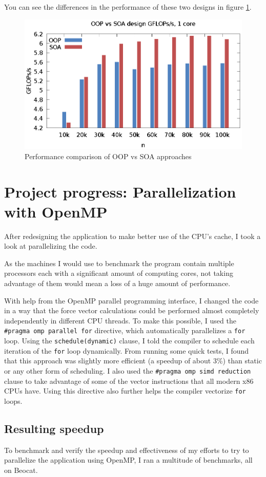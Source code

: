 \documentclass[journal]{IEEEtran}
\begin{document}
			You can see the differences in the performance of these two designs in figure \ref{oopsoa}.		
			
			\begin{figure}[ht]			
				\centering
				\includegraphics[width=.5\textwidth]{gnuplot/oop_vs_arr.eps}
				\caption{\label{oopsoa}Performance comparison of OOP vs SOA approaches}
			\end{figure} 
	
	\section{Project progress: Parallelization with OpenMP}
	
		After redesigning the application to make better use of the CPU's cache, I took a look at parallelizing the code.
		
		As the machines I would use to benchmark the program contain multiple processors each with a significant amount of computing cores, not taking advantage of them would mean a loss of a huge amount of performance.
		
		With help from the OpenMP parallel programming interface, I changed the code in a way that the force vector calculations could be performed almost completely independently in different CPU threads. To make this possible, I used the \texttt{\#pragma omp parallel for} directive, which automatically parallelizes a \texttt{for} loop. Using the \texttt{schedule(dynamic)} clause, I told the compiler to schedule each iteration of the \texttt{for} loop dynamically. From running some quick tests, I found that this approach was slightly more efficient (a speedup of about 3\%) than static or any other form of scheduling. I also used the \texttt{\#pragma omp simd reduction} clause to take advantage of some of the vector instructions that all modern x86 CPUs have. Using this directive also further helps the compiler vectorize \texttt{for} loops.
		
		\subsection*{Resulting speedup}
			To benchmark and verify the speedup and effectiveness of my efforts to try to parallelize the application using OpenMP, I ran a multitude of benchmarks, all on Beocat.
			
\end{document}
